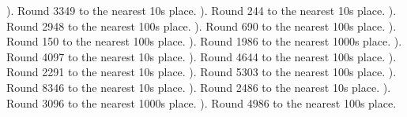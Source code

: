 \documentclass{article}%
\begin{document}
). Round 3349 to the nearest 10s place.%
\newline%
\newline%
). Round 244 to the nearest 10s place.%
\newline%
\newline%
). Round 2948 to the nearest 100s place.%
\newline%
\newline%
). Round 690 to the nearest 100s place.%
\newline%
\newline%
). Round 150 to the nearest 100s place.%
\newline%
\newline%
). Round 1986 to the nearest 1000s place.%
\newline%
\newline%
). Round 4097 to the nearest 10s place.%
\newline%
\newline%
). Round 4644 to the nearest 100s place.%
\newline%
\newline%
). Round 2291 to the nearest 10s place.%
\newline%
\newline%
). Round 5303 to the nearest 100s place.%
\newline%
\newline%
). Round 8346 to the nearest 10s place.%
\newline%
\newline%
). Round 2486 to the nearest 10s place.%
\newline%
\newline%
). Round 3096 to the nearest 1000s place.%
\newline%
\newline%
). Round 4986 to the nearest 100s place.%
\end{document}
